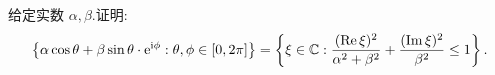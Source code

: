 \begin{problem}[选做]
给定实数 $\alpha,\beta$.证明:
\[
\left\{\alpha\cos\theta + \beta\sin\theta\cdot \mathrm{e}^{\mathrm{i}\phi} : \theta,\phi\in[0,2\pi]\right\}
=
\left\{\xi\in\mathbb{C} : \frac{(\operatorname{Re}\xi)^2}{\alpha^2+\beta^2} + \frac{(\operatorname{Im}\xi)^2}{\beta^2} \le 1\right\}.
\]

\begin{solution}
\end{solution}
\end{problem}
